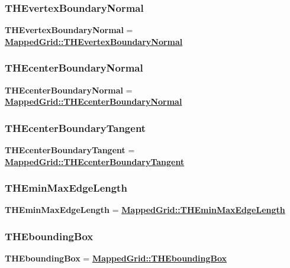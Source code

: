 \documentclass{article}
\begin{document}
  \subsubsection{THEvertexBoundaryNormal}
  \label{GridCollection::THEvertexBoundaryNormal}
    \textbf{THEvertexBoundaryNormal} =
    {\bf{}\hyperref{MappedGrid::THEvertexBoundaryNormal}{MappedGrid::THEvertexBoundaryNormal \rm(\S}{)}{MappedGrid::THEvertexBoundaryNormal}}

  \subsubsection{THEcenterBoundaryNormal}
  \label{GridCollection::THEcenterBoundaryNormal}
    \textbf{THEcenterBoundaryNormal} =
    {\bf{}\hyperref{MappedGrid::THEcenterBoundaryNormal}{MappedGrid::THEcenterBoundaryNormal \rm(\S}{)}{MappedGrid::THEcenterBoundaryNormal}}

  \subsubsection{THEcenterBoundaryTangent}
  \label{GridCollection::THEcenterBoundaryTangent}
    \textbf{THEcenterBoundaryTangent} =
    {\bf{}\hyperref{MappedGrid::THEcenterBoundaryTangent}{MappedGrid::THEcenterBoundaryTangent \rm(\S}{)}{MappedGrid::THEcenterBoundaryTangent}}

  \subsubsection{THEminMaxEdgeLength}
  \label{GridCollection::THEminMaxEdgeLength}
    \textbf{THEminMaxEdgeLength} =
    {\bf{}\hyperref{MappedGrid::THEminMaxEdgeLength}{MappedGrid::THEminMaxEdgeLength \rm(\S}{)}{MappedGrid::THEminMaxEdgeLength}}

  \subsubsection{THEboundingBox}
  \label{GridCollection::THEboundingBox}
    \textbf{THEboundingBox} =
    {\bf{}\hyperref{MappedGrid::THEboundingBox}{MappedGrid::THEboundingBox \rm(\S}{)}{MappedGrid::THEboundingBox}}
\end{document}

